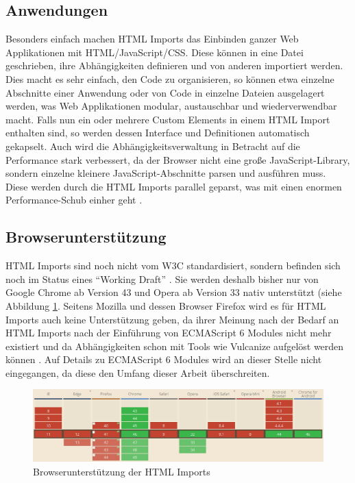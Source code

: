 \subsection{Anwendungen}\label{anwendungen}

Besonders einfach machen HTML Imports das Einbinden ganzer Web Applikationen mit HTML/JavaScript/CSS. Diese können in eine Datei geschrieben, ihre Abhängigkeiten definieren und von anderen importiert werden. Dies macht es sehr einfach, den Code zu organisieren, so können etwa einzelne Abschnitte einer Anwendung oder von Code in einzelne Dateien ausgelagert werden, was Web Applikationen modular, austauschbar und wiederverwendbar macht. Falls nun ein oder mehrere Custom Elements in einem HTML Import enthalten sind, so werden dessen Interface und Definitionen automatisch gekapselt. Auch wird die Abhängigkeitsverwaltung in Betracht auf die Performance stark verbessert, da der Browser nicht eine große JavaScript-Library, sondern einzelne kleinere JavaScript-Abschnitte parsen und ausführen muss. Diese werden durch die HTML Imports parallel geparst, was mit einen enormen Performance-Schub einher geht \cite{citeulike:13853647}.


\subsection{Browserunterstützung}\label{browserunterstuxfctzung}

HTML Imports sind noch nicht vom W3C standardisiert, sondern befinden sich noch im Status eines ``Working Draft'' \cite{citeulike:13853711}. Sie werden deshalb bisher nur von Google Chrome ab Version 43 und Opera ab Version 33 nativ unterstützt (siehe Abbildung \ref{fig:bdhtmli}. Seitens Mozilla und dessen Browser Firefox wird es für HTML Imports auch keine Unterstützung geben, da ihrer Meinung nach der Bedarf an HTML Imports nach der Einführung von ECMAScript 6 Modules nicht mehr existiert und da Abhängigkeiten schon mit Tools wie Vulcanize aufgelöst werden können \cite{citeulike:13881144}. Auf Details zu ECMAScript 6 Modules wird an dieser Stelle nicht eingegangen, da diese den Umfang dieser Arbeit überschreiten.

\begin{figure}[htbp]
 \centering
 \includegraphics[width=\linewidth]{kapitel2/bilder/5-html-imports-browserunterstuetzung}
 \caption{Browserunterstützung der HTML Imports}
 \label{fig:bdhtmli}
\end{figure}
